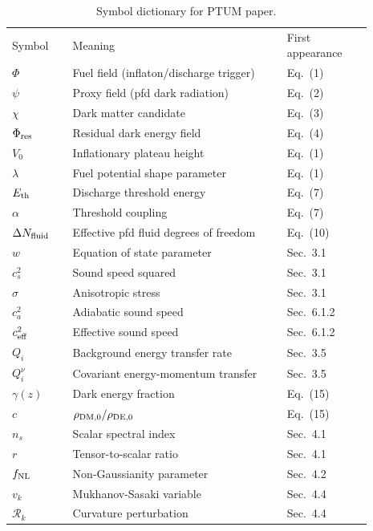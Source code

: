 \documentclass[epj]{svjour}
\begin{document}
\begin{table}[htbp]
\caption{Symbol dictionary for PTUM paper.}
\label{tab:symbols}
\centering
\small
\begin{tabular}{@{}>{\raggedright\arraybackslash}p{0.15\linewidth}>{\raggedright\arraybackslash}p{0.53\linewidth}>{\raggedright\arraybackslash}p{0.21\linewidth}@{}}
\hline\noalign{\smallskip}
Symbol & Meaning & First appearance \\
\noalign{\smallskip}\hline\noalign{\smallskip}
\(\Phi\) & Fuel field (inflaton/discharge trigger) & Eq.~(1) \\
\(\psi\) & Proxy field (pfd dark radiation) & Eq.~(2) \\
\(\chi\) & Dark matter candidate & Eq.~(3) \\
\(\Phi_{\rm res}\) & Residual dark energy field & Eq.~(4) \\
\(V_0\) & Inflationary plateau height & Eq.~(1) \\
\(\lambda\) & Fuel potential shape parameter & Eq.~(1) \\
\(E_{\rm th}\) & Discharge threshold energy & Eq.~(7) \\
\(\alpha\) & Threshold coupling & Eq.~(7) \\
\(\Delta N_{\rm fluid}\) & Effective pfd fluid degrees of freedom & Eq.~(10) \\
\(w\) & Equation of state parameter & Sec.~3.1 \\
\(c_s^2\) & Sound speed squared & Sec.~3.1 \\
\(\sigma\) & Anisotropic stress & Sec.~3.1 \\
\(c_a^2\) & Adiabatic sound speed & Sec.~6.1.2 \\
\(c_{\rm eff}^2\) & Effective sound speed & Sec.~6.1.2 \\
\(Q_i\) & Background energy transfer rate & Sec.~3.5 \\
\(Q_i^\nu\) & Covariant energy-momentum transfer & Sec.~3.5 \\
\(\gamma(z)\) & Dark energy fraction & Eq.~(15) \\
\(c\) & \(\rho_{\rm DM,0}/\rho_{\rm DE,0}\) & Eq.~(15) \\
\(n_s\) & Scalar spectral index & Sec.~4.1 \\
\(r\) & Tensor-to-scalar ratio & Sec.~4.1 \\
\(f_{\rm NL}\) & Non-Gaussianity parameter & Sec.~4.2 \\
\(v_k\) & Mukhanov-Sasaki variable & Sec.~4.4 \\
\(\mathcal{R}_k\) & Curvature perturbation & Sec.~4.4 \\

\end{tabular}
\end{table}
\end{document}
